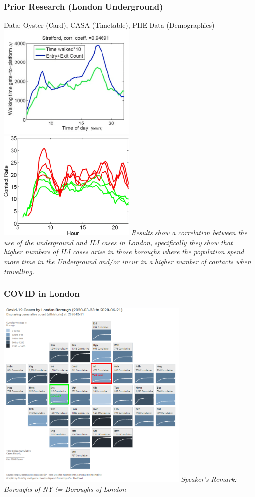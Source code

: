\documentclass{beamer}
\begin{document}
\begin{frame}
\frametitle{Prior Research (London Underground)}
Data: Oyster (Card), CASA (Timetable), PHE Data (Demographics)\\
\includegraphics[width=0.5\textwidth]{London_Walking_time.png}%
\includegraphics[width=0.5\textwidth]{London_Borough_Comparison.png}
\textit{Results show a correlation between the use of the underground and ILI cases in London, specifically they show that higher numbers of ILI cases arise in those boroughs where the population spend more time in the Underground and/or incur in a higher number of contacts when travelling.}
 \cite{gosce_johansson_2018}
\end{frame}
\begin{frame}
\frametitle{COVID in London}
\includegraphics[width=0.7\textwidth]{London_Covid_Adapted.png}
\textit{Speaker's Remark: Boroughs of NY != Boroughs of London}
\end{frame}
\end{document}
